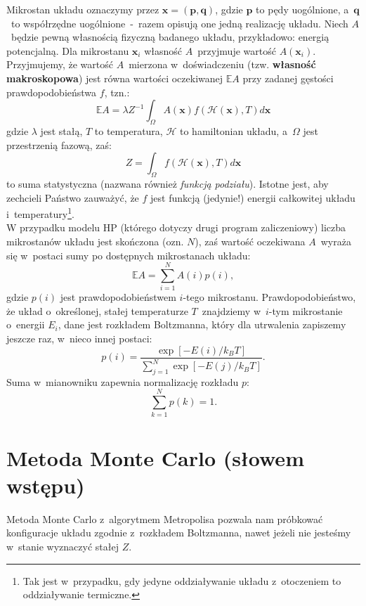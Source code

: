 \documentclass[a4paper,11pt,twoside]{book}
\begin{document}
Mikrostan układu oznaczymy przez $\mathbf{x} = (\mathbf{p}, \mathbf{q})$, gdzie $\mathbf{p}$ to pędy uogólnione, a~$\mathbf{q}$~to współrzędne uogólnione~-~razem opisują one jedną realizację układu. Niech $A$~będzie pewną własnością fizyczną badanego układu, przykładowo: energią potencjalną. Dla mikrostanu $\mathbf{x}_i$ własność $A$~przyjmuje wartość $A(\mathbf{x}_i)$. Przyjmujemy, że wartość $A$~mierzona w~doświadczeniu (tzw. {\bf własność makroskopowa}) jest równa wartości oczekiwanej $\mathbb{E} A$ przy zadanej gęstości prawdopodobieństwa $f$, tzn.:
\begin{displaymath}
\mathbb{E} A = \lambda Z^{-1} \int_{\Omega} A(\mathbf{x}) f(\mathcal{H}(\mathbf{x}),T) d\mathbf{x}
\end{displaymath}
gdzie $\lambda$ jest stałą, $T$ to temperatura, $\mathcal{H}$ to hamiltonian układu, a~$\Omega$ jest przestrzenią fazową, zaś:
\begin{displaymath}
Z = \int_{\Omega} f(\mathcal{H}(\mathbf{x}),T) d\mathbf{x}
\end{displaymath}
to suma statystyczna (nazwana również \emph{funkcją podziału}). Istotne jest, aby zechcieli Państwo zauważyć, że $f$ jest funkcją (jedynie!) energii całkowitej układu i~temperatury\footnote{Tak jest w~przypadku, gdy jedyne oddziaływanie układu z~otoczeniem to oddziaływanie termiczne.}.\\

W przypadku modelu HP (którego dotyczy drugi program zaliczeniowy) liczba mikrostanów układu jest skończona (ozn. $N$), zaś wartość oczekiwana $A$~wyraża się w~postaci sumy po dostępnych mikrostanach układu:
\begin{equation}
\mathbb{E} A = \sum_{i=1}^N A(i) p(i),\label{oczekiwana}
\end{equation}
gdzie $p(i)$ jest prawdopodobieństwem $i$-tego mikrostanu. Prawdopodobieństwo, że układ o~określonej, stałej temperaturze $T$~znajdziemy w~$i$-tym mikrostanie o~energii $E_i$, dane jest rozkładem Boltzmanna, który dla utrwalenia zapiszemy jeszcze raz, w~nieco innej postaci:
\begin{equation}
p(i) = \frac{\exp [ -E(i)/k_B T ]}{\sum_{j=1}^N \exp [ -E(j)/k_B T ]} .
\end{equation}
Suma w~mianowniku zapewnia normalizację rozkładu $p$:
\begin{displaymath}
\sum_{k=1}^N p(k) =1.
\end{displaymath}
\section{Metoda Monte Carlo (słowem wstępu)}
Metoda Monte Carlo z~algorytmem Metropolisa pozwala nam próbkować konfiguracje układu zgodnie z~rozkładem Boltzmanna, nawet jeżeli nie jesteśmy w~stanie wyznaczyć stałej $Z$.\\
\end{document}

